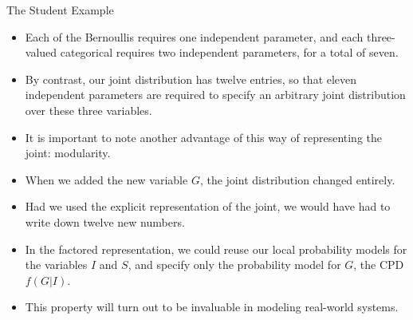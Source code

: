 \documentclass[handout]{beamer}
\begin{document}
\begin{frame}{The Student Example}
\scriptsize{
\begin{itemize}
	\item Each of the Bernoullis requires one independent parameter, and each three-valued categorical requires two independent parameters, for a total of seven. 
	\item By contrast, our joint distribution has twelve entries, so that eleven independent
parameters are required to specify an arbitrary joint distribution over these three variables.
\item It is important to note another advantage of this way of representing the joint: modularity.
\item When we added the new variable $G$, the joint distribution changed entirely. 
\item Had we used the explicit representation of the joint, we would have had to write down twelve new numbers. 
\item In the factored representation, we could reuse our local probability models for the variables $I$ and $S$, and specify only the probability model for $G$, the CPD $f(G | I)$. 
\item This property will turn out to be invaluable in modeling real-world systems.
	

\end{itemize}



} 

\end{frame}
\end{document}
